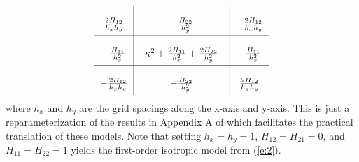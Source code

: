 \documentclass[review]{elsarticle}
\begin{document}
\begin{equation}
\label{e:3}
       \arraycolsep=6.0pt\def\arraystretch{2.5}
   \begin{array}{c|c|c}
      \frac{2H_{12}}{h_x h_y} & -\frac{H_{22}}{h_y^2} & -\frac{2H_{12}}{h_x h_y} \\
        \hline
      -\frac{H_{11}}{h_x^2} & \;\; \kappa^2 + \frac{2H_{11}}{h_x^2} + \frac{2H_{22}}{h_y^2} \;\; & -\frac{H_{11}}{h_x^2} \\
      \hline
      -\frac{2H_{12}}{h_x h_y} & -\frac{H_{22}}{h_y^2} & \frac{2H_{12}}{h_x h_y} \\
    \end{array} 
\end{equation}
where $h_x$ and $h_y$ are the grid spacings along the x-axis and y-axis. This is just a reparameterization of the results in Appendix A of \cite{lindgren2011explicit} which facilitates the practical translation of these models. Note that setting $h_x = h_y =1$, $H_{12} = H_{21} =0$, and $H_{11} = H_{22} = 1$ yields the first-order isotropic model from (\ref{e:2}).

\end{document}
